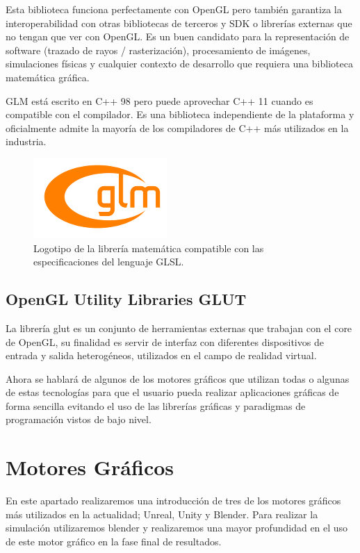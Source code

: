 \documentclass[a4paper, 17pt]{book}
\begin{document}
Esta biblioteca funciona perfectamente con OpenGL pero también garantiza la interoperabilidad con otras
bibliotecas de terceros y SDK o librerías externas que no tengan que ver con OpenGL. Es un buen candidato
para la representación de software (trazado de rayos / rasterización), procesamiento de imágenes,
simulaciones físicas y cualquier contexto de desarrollo que requiera una biblioteca matemática gráfica.

GLM está escrito en C++ 98 pero puede aprovechar C++ 11 cuando es compatible con el compilador. Es una
biblioteca independiente de la plataforma y oficialmente admite la mayoría de los compiladores de C++
más utilizados en la industria.

\begin{figure}[hbt!]
    \centering
    \includegraphics[scale=0.80, keepaspectratio]{img/logo_glm.png}
    \caption{Logotipo de la librería matemática compatible con las especificaciones del lenguaje GLSL.}
    \label{figura:logo_glm}
\end{figure}

\subsection{OpenGL Utility Libraries GLUT} 
\label{subsec:GLUT}


La librería glut es un conjunto de herramientas externas que trabajan con el core de OpenGL,
su finalidad es servir de interfaz con diferentes dispositivos de entrada y salida heterogéneos,
utilizados en el campo de realidad virtual.

Ahora se hablará de algunos de los motores gráficos que utilizan todas o algunas de estas
tecnologías para que el usuario pueda realizar aplicaciones gráficas de forma sencilla evitando
el uso de las librerías gráficas y paradigmas de programación vistos de bajo nivel.

\section{Motores Gráficos} 
\label{sec:Motores}

En este apartado realizaremos una introducción de tres de los motores gráficos más utilizados
en la actualidad; Unreal, Unity y Blender. Para realizar la simulación utilizaremos blender y
realizaremos una mayor profundidad en el uso de este motor gráfico en la fase final de resultados.
\end{document}
